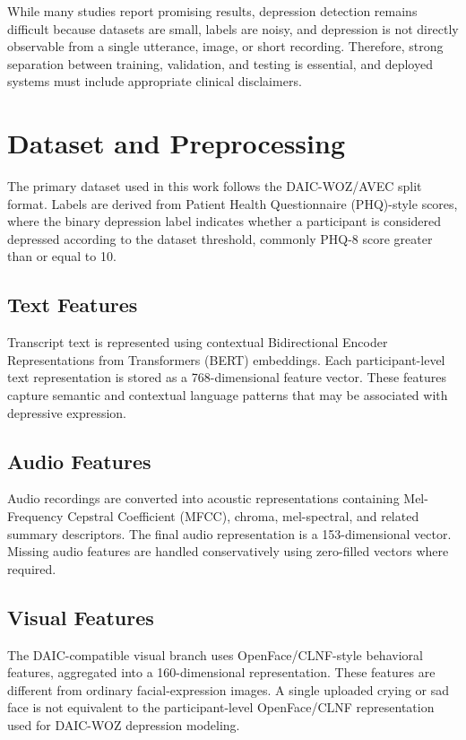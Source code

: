 \documentclass[conference]{IEEEtran}
\begin{document}
While many studies report promising results, depression detection remains difficult because datasets are small, labels are noisy, and depression is not directly observable from a single utterance, image, or short recording. Therefore, strong separation between training, validation, and testing is essential, and deployed systems must include appropriate clinical disclaimers.

\section{Dataset and Preprocessing}
The primary dataset used in this work follows the DAIC-WOZ/AVEC split format. Labels are derived from Patient Health Questionnaire (PHQ)-style scores, where the binary depression label indicates whether a participant is considered depressed according to the dataset threshold, commonly PHQ-8 score greater than or equal to 10.

\subsection{Text Features}
Transcript text is represented using contextual Bidirectional Encoder Representations from Transformers (BERT) embeddings. Each participant-level text representation is stored as a 768-dimensional feature vector. These features capture semantic and contextual language patterns that may be associated with depressive expression.

\subsection{Audio Features}
Audio recordings are converted into acoustic representations containing Mel-Frequency Cepstral Coefficient (MFCC), chroma, mel-spectral, and related summary descriptors. The final audio representation is a 153-dimensional vector. Missing audio features are handled conservatively using zero-filled vectors where required.

\subsection{Visual Features}
The DAIC-compatible visual branch uses OpenFace/CLNF-style behavioral features, aggregated into a 160-dimensional representation. These features are different from ordinary facial-expression images. A single uploaded crying or sad face is not equivalent to the participant-level OpenFace/CLNF representation used for DAIC-WOZ depression modeling.
\end{document}
